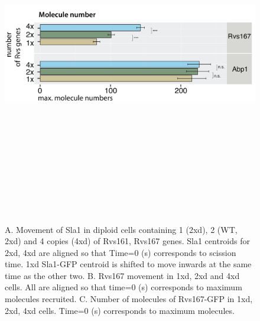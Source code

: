 \vspace{3mm}
	\begin{figure}[H]
	\centering
	\hspace{-2cm}
	\includegraphics[width=15cm,height=15cm,keepaspectratio]{figures/results_final/protein_frictionB_4}
	\vspace*{2mm}
	\caption[Titration of Rvs molecule numbers in diploid cells]
	{A. Movement of Sla1 in diploid cells containing 1 (2xd), 2 (WT, 2xd) and 4 copies (4xd) of Rvs161, Rvs167 genes. Sla1 centroids for 2xd, 4xd are aligned so that Time=0 (s) corresponds to scission time. 1xd Sla1-GFP centroid is shifted to move inwards at the same time as the other two.
		B. Rvs167 movement in 1xd, 2xd and 4xd cells. All are aligned so that time=0 (s) corresponds to maximum molecules recruited.
		C.  Number of molecules of Rvs167-GFP in 1xd, 2xd, 4xd cells. Time=0 (s) corresponds to maximum molecules. 
		\label{fig_rvsdiploid2}}
\end{figure}




				
			




\newpage
